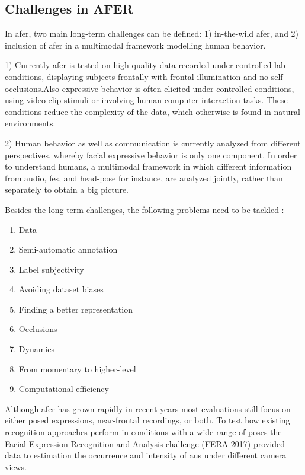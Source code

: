 
\subsection{Challenges in AFER}

In \gls{afer}, two main long-term challenges can be defined: 1) in-the-wild \gls{afer}, and 2) inclusion of \gls{afer} in a multimodal framework modelling human behavior.\cite{Martinez2016}

1) Currently \gls{afer} is tested on high quality data recorded under controlled lab conditions, displaying subjects frontally with frontal illumination and no self occlusions.Also expressive behavior is often elicited under controlled conditions, using video clip stimuli or involving human-computer interaction tasks.
These conditions reduce the complexity of the data, which otherwise is found in natural environments.

2) Human behavior as well as communication is currently analyzed from different perspectives, whereby facial expressive behavior is only one component. In order to understand humans, a multimodal framework in which different information from audio, \glspl{fe}, and head-pose for instance, are analyzed jointly, rather than separately to obtain a big picture.  

Besides the long-term challenges, the following problems need to be tackled \cite{Martinez2016}:
\begin{enumerate}
\item Data
\item Semi-automatic annotation
\item Label subjectivity
\item Avoiding dataset biases
\item Finding a better representation
\item Occlusions
\item Dynamics
\item From momentary to higher-level
\item Computational efficiency
\end{enumerate}




Although \gls{afer} has grown rapidly in recent years most evaluations still focus on either posed expressions, near-frontal
recordings, or both. To test how existing recognition approaches perform in conditions with a wide range of poses the 
Facial Expression Recognition and Analysis challenge (FERA 2017) provided data to estimation the occurrence and intensity of \glspl{au} under different camera views. 





